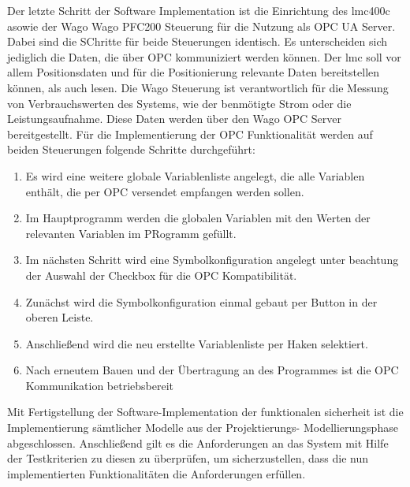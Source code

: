\documentclass[../../../Bachelorarbeit.tex]{subfiles}
\begin{document}
Der letzte Schritt der Software Implementation ist die Einrichtung des \acs{lmc}400c asowie der Wago Wago PFC200 Steuerung für die Nutzung als OPC UA Server. Dabei sind die SChritte für beide Steuerungen identisch. Es unterscheiden sich jediglich die Daten, die über OPC kommuniziert werden können. Der \acs{lmc} soll vor allem Positionsdaten und für die Positionierung relevante Daten bereitstellen können, als auch lesen. Die Wago Steuerung ist verantwortlich für die Messung von Verbrauchswerten des Systems, wie der benmötigte Strom oder die Leistungsaufnahme. Diese Daten werden über den Wago OPC Server bereitgestellt. Für die Implementierung der OPC Funktionalität werden auf beiden Steuerungen folgende Schritte durchgeführt:

\begin{enumerate}
    \item Es wird eine weitere globale Variablenliste angelegt, die alle Variablen enthält, die per OPC versendet \bzw empfangen werden sollen.
    \item Im Hauptprogramm werden die globalen Variablen mit den Werten der relevanten Variablen im PRogramm gefüllt.
    \item Im nächsten Schritt wird eine Symbolkonfiguration angelegt unter beachtung der Auswahl der Checkbox für die OPC Kompatibilität.
    \item Zunächst wird die Symbolkonfiguration einmal gebaut per Button in der oberen Leiste.
    \item Anschließend wird die neu erstellte Variablenliste per Haken selektiert.
    \item Nach erneutem Bauen und der Übertragung an des Programmes ist die OPC Kommunikation betriebsbereit
\end{enumerate}

Mit Fertigstellung der Software-Implementation der funktionalen sicherheit ist die Implementierung sämtlicher Modelle aus der Projektierungs- \bzw Modellierungsphase abgeschlossen. Anschließend gilt es die Anforderungen an das System mit Hilfe der Testkriterien zu diesen zu überprüfen, um sicherzustellen, dass die nun implementierten Funktionalitäten die Anforderungen erfüllen.
\end{document}
